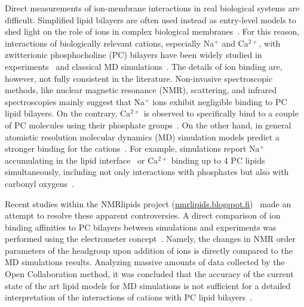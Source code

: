 \documentclass[aip,jcp,twocolumn]{revtex4}
\begin{document}
Direct measurements of ion-membrane interactions in real biological systems are difficult. Simplified lipid bilayers are often used instead as entry-level models to shed light on the role of ions in complex biological membranes~\cite{scherer87,seelig90,cevc90}. For this reason, interactions of biologically relevant cations, especially Na$^+$ and Ca$^{2+}$, with zwitterionic phosphocholine (PC) bilayers have been widely studied in experiments~\cite{akutsu81, altenbach84, seelig90, cevc90, tocanne90, binder02, pabst07, uhrikova08} and classical MD simulations~\cite{bockmann03, bockmann04, Berkowitz12, melcrova16, javanainen17}. The details of ion binding are, however, not fully consistent in the literature. Non-invasive spectroscopic methods, like nuclear magnetic resonance (NMR), scattering, and infrared spectroscopies mainly suggest that Na$^+$ ions exhibit negligible binding to PC lipid bilayers. On the contrary, Ca$^{2+}$ is observed to specifically bind to a couple of PC molecules using their phosphate groups~\cite{hauser76, hauser78, herbette84, akutsu81, altenbach84, binder02, pabst07, uhrikova08}. On the other hand, in general atomistic resolution molecular dynamics (MD) simulation models predict a stronger binding for the cations~\cite{catte16}. For example, simulations report Na$^+$ accumulating in the lipid interface~\cite{bockmann03} or Ca$^{2+}$ binding up to 4 PC lipids simultaneously, including not only interactions with phosphates but also with carbonyl oxygens~\cite{bockmann04, melcrova16, javanainen17}.

Recent studies within the NMRlipids project (\url{nmrlipids.blogspot.fi})~\cite{catte16} made an attempt to resolve these apparent controversies. A direct comparison of ion binding affinities to PC bilayers between simulations and experiments was performed using the electrometer concept~\cite{seelig87}. Namely, the changes in NMR order parameters of the headgroup upon addition of ions is directly compared to the MD simulations results. Analyzing massive amounts of data collected by the Open Collaboration method, it was concluded that the accuracy of the current state of the art lipid models for MD simulations is not sufficient for a detailed interpretation of the interactions of cations with PC lipid bilayers~\cite{catte16}.



\end{document}
